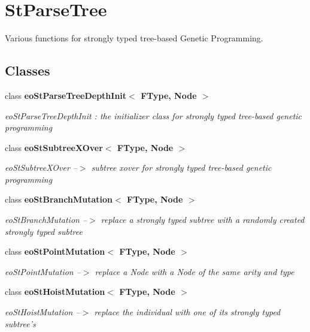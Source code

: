 \section{St\-Parse\-Tree}
\label{group___st_parse_tree}
Various functions for strongly typed tree-based Genetic Programming.  
\subsection*{Classes}
\begin{CompactItemize}
\item 
class {\bf eo\-St\-Parse\-Tree\-Depth\-Init$<$ FType, Node $>$}
\begin{CompactList}\small\item\em eo\-St\-Parse\-Tree\-Depth\-Init : the initializer class for strongly typed tree-based genetic programming \item\end{CompactList}\item 
class {\bf eo\-St\-Subtree\-XOver$<$ FType, Node $>$}
\begin{CompactList}\small\item\em eo\-St\-Subtree\-XOver --$>$ subtree xover for strongly typed tree-based genetic programming \item\end{CompactList}\item 
class {\bf eo\-St\-Branch\-Mutation$<$ FType, Node $>$}
\begin{CompactList}\small\item\em eo\-St\-Branch\-Mutation --$>$ replace a strongly typed subtree with a randomly created strongly typed subtree \item\end{CompactList}\item 
class {\bf eo\-St\-Point\-Mutation$<$ FType, Node $>$}
\begin{CompactList}\small\item\em eo\-St\-Point\-Mutation --$>$ replace a Node with a Node of the same arity and type \item\end{CompactList}\item 
class {\bf eo\-St\-Hoist\-Mutation$<$ FType, Node $>$}
\begin{CompactList}\small\item\em eo\-St\-Hoist\-Mutation --$>$ replace the individual with one of its strongly typed subtree's \item\end{CompactList}\end{CompactItemize}


